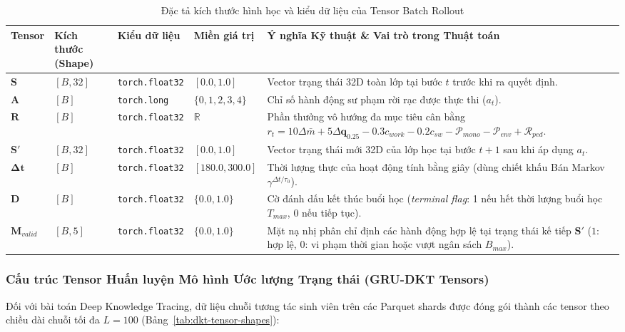 \begin{table}[htbp]
  \centering\small
  \caption{Đặc tả kích thước hình học và kiểu dữ liệu của Tensor Batch Rollout}\label{tab:rollout-tensor-shapes}
  \begin{tabularx}{\textwidth}{l p{2.8cm} l p{2.2cm} X}
    \toprule
    \textbf{Tensor} & \textbf{Kích thước (Shape)} & \textbf{Kiểu dữ liệu} & \textbf{Miền giá trị} & \textbf{Ý nghĩa Kỹ thuật \& Vai trò trong Thuật toán} \\
    \midrule
    $\mathbf{S}$ & $[B, 32]$ & \texttt{torch.float32} & $[0.0, 1.0]$ & Vector trạng thái 32D toàn lớp tại bước $t$ trước khi ra quyết định. \\
    \addlinespace
    $\mathbf{A}$ & $[B]$ & \texttt{torch.long} & $\{0, 1, 2, 3, 4\}$ & Chỉ số hành động sư phạm rời rạc được thực thi ($a_t$). \\
    \addlinespace
    $\mathbf{R}$ & $[B]$ & \texttt{torch.float32} & $\mathbb{R}$ & Phần thưởng vô hướng đa mục tiêu cân bằng $r_t = 10\Delta \bar{m} + 5\Delta \mathbf{q}_{0.25} - 0.3c_{work} - 0.2c_{sw} - \mathcal{P}_{mono} - \mathcal{P}_{env} + \mathcal{R}_{ped}$. \\
    \addlinespace
    $\mathbf{S}'$ & $[B, 32]$ & \texttt{torch.float32} & $[0.0, 1.0]$ & Vector trạng thái mới 32D của lớp học tại bước $t+1$ sau khi áp dụng $a_t$. \\
    \addlinespace
    $\bm{\Delta t}$ & $[B]$ & \texttt{torch.float32} & $[180.0, 300.0]$ & Thời lượng thực của hoạt động tính bằng giây (dùng chiết khấu Bán Markov $\gamma^{\Delta t / \tau_0}$). \\
    \addlinespace
    $\mathbf{D}$ & $[B]$ & \texttt{torch.float32} & $\{0.0, 1.0\}$ & Cờ đánh dấu kết thúc buổi học (\textit{terminal flag}: 1 nếu hết thời lượng buổi học $T_{max}$, 0 nếu tiếp tục). \\
    \addlinespace
    $\mathbf{M}_{valid}$ & $[B, 5]$ & \texttt{torch.float32} & $\{0.0, 1.0\}$ & Mặt nạ nhị phân chỉ định các hành động hợp lệ tại trạng thái kế tiếp $\mathbf{S}'$ ($1$: hợp lệ, $0$: vi phạm thời gian hoặc vượt ngân sách $B_{max}$). \\
    \bottomrule
  \end{tabularx}
\end{table}

\subsubsection{Cấu trúc Tensor Huấn luyện Mô hình Ước lượng Trạng thái (GRU-DKT Tensors)}
Đối với bài toán Deep Knowledge Tracing, dữ liệu chuỗi tương tác sinh viên trên các Parquet shards được đóng gói thành các tensor theo chiều dài chuỗi tối đa $L = 100$ (Bảng~\ref{tab:dkt-tensor-shapes}):

